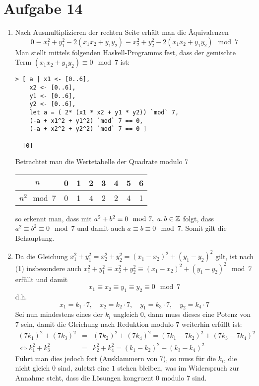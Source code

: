\section*{Aufgabe 14}
\begin{enumerate}[(1)]
	\item
		Nach Ausmultiplizieren der rechten Seite erhält man die Äquivalenzen
		\[ 0 \equiv x_1^2 + y_1^2 - 2(x_1x_2 + y_1y_2) \equiv x_2^2 + y_2^2 - 2(x_1x_2 + y_1y_2)\mod 7 \]
		Man stellt mittels folgenden Haskell-Programms fest, dass der
		gemischte Term $(x_1x_2 + y_1y_2) \equiv 0\mod 7$ ist:
		\begin{lstlisting}
> [ a | x1 <- [0..6], 
	x2 <- [0..6],
	y1 <- [0..6],
	y2 <- [0..6],
	let a = ( 2* (x1 * x2 + y1 * y2)) `mod` 7,
	(-a + x1^2 + y1^2) `mod` 7 == 0,
	(-a + x2^2 + y2^2) `mod` 7 == 0 ]
	
  [0]
		\end{lstlisting}
		Betrachtet man die Wertetabelle der Quadrate modulo 7

		\begin{tabular}{c|ccccccc}
			$n$&0&1&2&3&4&5&6\\
			\hline
			$n^2\mod 7$&0&1&4&2&2&4&1
		\end{tabular}

		so erkennt man, dass mit $a^2 + b^2 \equiv 0\mod7,\ a,b \in \mathbb{Z}$
		folgt, dass $a^2 \equiv b^2 \equiv 0\mod 7$ und damit auch $a
		\equiv b \equiv 0\mod7$. Somit gilt die Behauptung.
	\item
		Da die Gleichung
		$x_1^2+y_1^2=x_2^2+y_2^2=(x_1-x_2)^2+(y_1-y_2)^2$ gilt, ist
		nach (1) insbesondere auch $x_1^2+y_1^2\equiv x_2^2+y_2^2\equiv
		(x_1-x_2)^2+(y_1-y_2)^2\mod 7$ erfüllt und damit
		\[ x_1 \equiv x_2 \equiv y_1 \equiv y_2 \equiv 0\mod 7 \]
		d.h.
		\[ x_1 = k_1 \cdot 7,\quad x_2 = k_2 \cdot 7,\quad y_1 = k_3 \cdot 7,\quad y_2 = k_4 \cdot 7 \]
		Sei nun mindestens eines der $k_i$ ungleich $0$, dann muss
		dieses eine Potenz von $7$ sein, damit die Gleichung nach
		Reduktion modulo $7$ weiterhin erfüllt ist:
		\begin{eqnarray*}
			(7 k_1)^2+(7 k_3)^2&=&(7 k_2)^2+(7 k_4)^2=(7 k_1 - 7 k_2)^2 + (7 k_3 - 7 k_4)^2 \\
			\Leftrightarrow k_1^2+k_3^2&=&k_2^2+k_4^2=(k_1 - k_2)^2 + (k_3 - k_4)^2
		\end{eqnarray*}
		Führt man dies jedoch fort (Ausklammern von 7), so muss für die
		$k_i$, die nicht gleich $0$ sind, zuletzt eine $1$ stehen
		bleiben, was im Widerspruch zur Annahme steht, dass die
		Lösungen kongruent $0$ modulo $7$ sind.


\end{enumerate}
